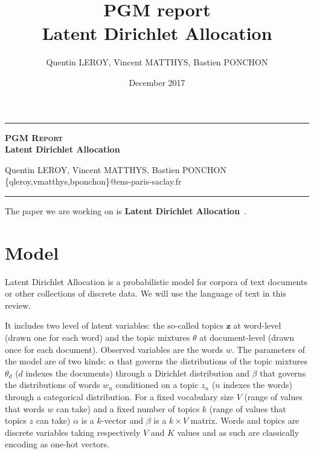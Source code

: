 \documentclass[12pt,a4paper,onecolumn]{article}
\title{PGM report \\ Latent Dirichlet Allocation}
\author{Quentin LEROY, Vincent MATTHYS, Bastien PONCHON}
\date{December 2017}
\begin{document}
\begin{center}

	\rule[11pt]{5cm}{0.5pt}

	\textbf{\Large \textsc{PGM Report} \\ Latent Dirichlet Allocation}
	\vspace{0.5cm}

    Quentin LEROY, Vincent MATTHYS, Bastien PONCHON\\
    \{qleroy,vmatthys,bponchon\}@ens-paris-saclay.fr
    
	\rule{5cm}{0.5pt}

	\vspace{1cm}
\end{center}


The paper we are working on is \textbf{Latent Dirichlet Allocation}~\cite{lda_2003}.

\section{Model}

Latent Dirichlet Allocation is a probabilistic model for corpora of text documents or other collections of discrete data. We will use the language of text in this review. 

It includes two level of latent variables: the so-called topics $\mathbf{z}$ at word-level (drawn one for each word) and the topic mixtures $\theta$ at document-level (drawn once for each document). Observed variables are the words $w$. The parameters of the model are of two kinds: $\alpha$ that governs the distributions of the topic mixtures $\theta_d$ ($d$ indexes the documents) through a Dirichlet distribution and $\beta$ that governs the distributions of words $w_n$ conditioned on a topic $z_n$ ($n$ indexes the words) through a categorical distribution. For a fixed vocabulary size $V$ (range of values that words $w$ can take) and a fixed number of topics $k$ (range of values that topics $z$ can take) $\alpha$ is a $k$-vector and $\beta$ is a $k \times V$ matrix. Words and topics are discrete variables taking respectively $V$ and $K$ values and as such are classically encoding as one-hot vectors.
\end{document}
